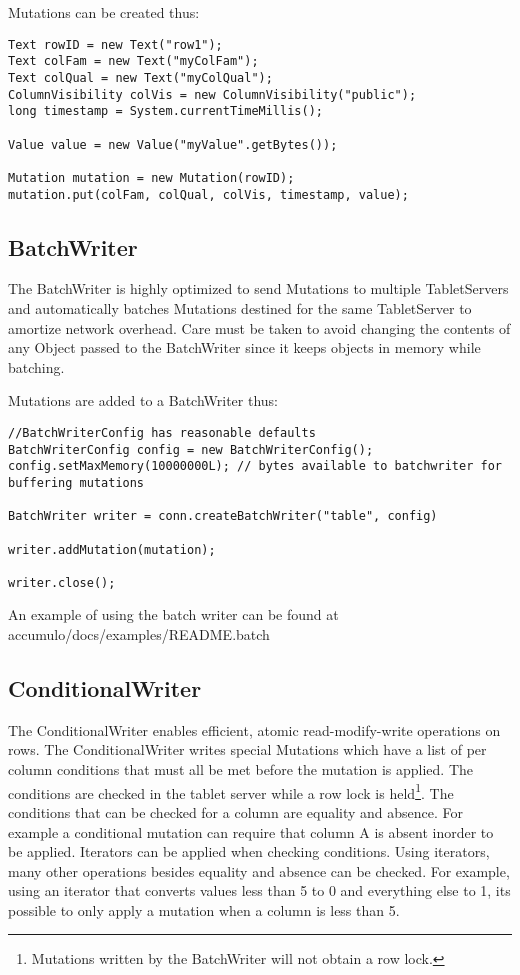 Mutations can be created thus:

\begingroup\fontsize{8pt}{8pt}\selectfont\begin{verbatim}
Text rowID = new Text("row1");
Text colFam = new Text("myColFam");
Text colQual = new Text("myColQual");
ColumnVisibility colVis = new ColumnVisibility("public");
long timestamp = System.currentTimeMillis();

Value value = new Value("myValue".getBytes());

Mutation mutation = new Mutation(rowID);
mutation.put(colFam, colQual, colVis, timestamp, value);
\end{verbatim}\endgroup

\subsection{BatchWriter}
The BatchWriter is highly optimized to send Mutations to multiple TabletServers
and automatically batches Mutations destined for the same TabletServer to
amortize network overhead. Care must be taken to avoid changing the contents of
any Object passed to the BatchWriter since it keeps objects in memory while
batching.

Mutations are added to a BatchWriter thus:

\begingroup\fontsize{8pt}{8pt}\selectfont\begin{verbatim}
//BatchWriterConfig has reasonable defaults
BatchWriterConfig config = new BatchWriterConfig();
config.setMaxMemory(10000000L); // bytes available to batchwriter for buffering mutations

BatchWriter writer = conn.createBatchWriter("table", config)

writer.addMutation(mutation);

writer.close();
\end{verbatim}\endgroup

An example of using the batch writer can be found at\\
accumulo/docs/examples/README.batch

\subsection{ConditionalWriter} 
The ConditionalWriter enables efficient, atomic read-modify-write operations on
rows.  The ConditionalWriter writes special Mutations which have a list of per
column conditions that must all be met before the mutation is applied.  The
conditions are checked in the tablet server while a row lock is
held\footnote{Mutations written by the BatchWriter will not obtain a row
lock.}.  The conditions that can be checked for a column are equality and
absence.  For example a conditional mutation can require that column A is
absent inorder to be applied.  Iterators can be applied when checking
conditions.  Using iterators, many other operations besides equality and
absence can be checked.  For example, using an iterator that converts values
less than 5 to 0 and everything else to 1, its possible to only apply a
mutation when a column is less than 5.

